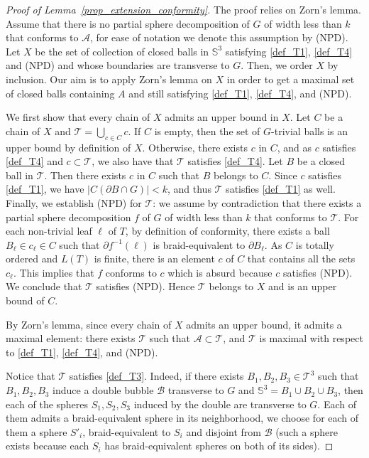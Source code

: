 \documentclass[11pt,a4paper]{article}
\newcommand{\Sp}{\mathbb S}
\newcommand{\T}{\mathcal{T}}
\newcommand{\B}{\mathcal{B}}
\begin{document}
\begin{proof}[Proof of Lemma~\ref{prop_extension_conformity}]
  The proof relies on Zorn's lemma. Assume that there is no partial sphere decomposition of $G$ of width less than $k$ that conforms to $\mathcal{A}$, for ease of notation we denote this assumption by (NPD). Let $X$ be the set of collection of closed balls in $\Sp^3$ satisfying \ref{def_T1}, \ref{def_T4} and (NPD) and whose boundaries are transverse to $G$. Then, we order $X$ by inclusion. Our aim is to apply Zorn's lemma on $X$ in order to get a maximal set of closed balls containing $A$ and still satisfying \ref{def_T1}, \ref{def_T4}, and (NPD).
  
  We first show that every chain of $X$ admits an upper bound in $X$. Let $C$ be a chain of $X$ and $\T = \bigcup_{c \in C} c$. If $C$ is empty, then the set of $G$-trivial balls is an upper bound by definition of $X$. Otherwise, there exists $c$ in $C$, and as $c$ satisfies \ref{def_T4} and $c \subset \T$, we also have that $\T$ satisfies \ref{def_T4}. Let $B$ be a closed ball in $\T$. Then there exists $c$ in $C$ such that $B$ belongs to $C$. Since $c$ satisfies \ref{def_T1}, we have $|C(\partial B \cap G)| < k$, and thus $\T$ satisfies \ref{def_T1} as well. Finally, we establish (NPD) for $\T$: we assume by contradiction that there exists a partial sphere decomposition $f$ of $G$ of width less than $k$ that conforms to $\T$. For each non-trivial leaf $\ell$ of $T$, by definition of conformity, there exists a ball $B_\ell \in c_\ell \in C$ such that $\partial f^{-1} (\ell)$ is braid-equivalent to $\partial B_\ell$. As $C$ is totally ordered and $L(T)$ is finite, there is an element $c$ of $C$ that contains all the sets $c_\ell$. This implies that $f$ conforms to $c$ which is absurd because $c$ satisfies (NPD). We conclude that $\T$ satisfies (NPD). Hence $\T$ belongs to $X$ and is an upper bound of $C$.

By Zorn's lemma, since every chain of $X$ admits an upper bound, it admits a maximal element: there exists $\T$ such that $\mathcal{A} \subset \T$, and $\T$ is maximal with respect to \ref{def_T1}, \ref{def_T4}, and (NPD). 


Notice that $\T$ satisfies \ref{def_T3}. Indeed, if there exists $B_1,B_2,B_3 \in \T^3$ such that $B_1,B_2,B_3$ induce a double bubble $\B$ transverse to $G$ and $\Sp^3 = B_1 \cup B_2 \cup B_3$, then each of the spheres $S_1,S_2,S_3$ induced by the double are transverse to $G$. Each of them admits a braid-equivalent sphere in its neighborhood, we choose for each of them a sphere $S'_i$, braid-equivalent to $S_i$ and disjoint from $\B$ (such a sphere exists because each $S_i$ has braid-equivalent spheres on both of its sides). 


\end{proof}
\end{document}
